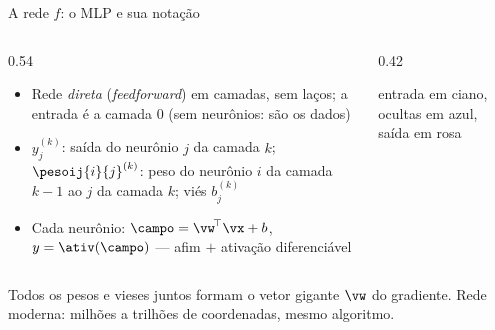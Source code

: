 \documentclass[aspectratio=169, 11pt]{beamer}
\begin{document}
\begin{frame}{A rede $f$: o MLP e sua notação}
  \begin{columns}[T]
    \begin{column}{0.54\textwidth}
      \begin{itemize}\setlength{\itemsep}{0.3ex}
        \item Rede \emph{direta} (\emph{feedforward}) em camadas, sem laços;
              a entrada é a camada $0$ (sem neurônios: são os dados)
        \item $y_j^{(k)}$: saída do neurônio $j$ da camada $k$;\;
              $\pesoij{i}{j}^{(k)}$: peso do neurônio $i$ da camada $k{-}1$ ao
              $j$ da camada $k$; viés $b_j^{(k)}$
        \item Cada neurônio: $\campo = \vw^{\!\top}\vx + b$,\; $y = \ativ(\campo)$
              — afim $+$ ativação \alert{diferenciável}
      \end{itemize}
    \end{column}
    \begin{column}{0.42\textwidth}
      \begin{center}

        {\color{icCinza}\scriptsize entrada em ciano, ocultas em azul, saída em rosa}
      \end{center}
    \end{column}
  \end{columns}

  \begin{ideiabox}
    Todos os pesos e vieses juntos formam o vetor gigante $\vw$ do gradiente.
    Rede moderna: milhões a trilhões de coordenadas, mesmo algoritmo.
  \end{ideiabox}
\end{frame}
\end{document}

